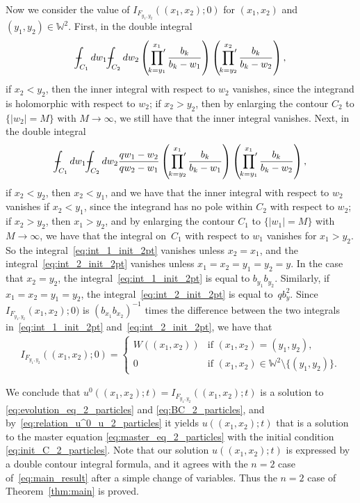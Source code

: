 \documentclass[pdftex]{sigma}
\numberwithin{equation}{section}
\def\Xint#1{\mathchoice
{\XXint\displaystyle\textstyle{#1}}%
{\XXint\textstyle\scriptstyle{#1}}%
{\XXint\scriptstyle\scriptscriptstyle{#1}}%
{\XXint\scriptscriptstyle\scriptscriptstyle{#1}}%
\!\int}
\def\XXint#1#2#3{{\setbox0=\hbox{$#1{#2#3}{\int}$}
\vcenter{\hbox{$#2#3$}}\kern-.5\wd0}}
\def\dashint{\Xint-}
\newcommand{\prodprime}{\sideset{}{'}\prod}
\newcommand{\Weylchamber}{\mathbb{W}}
\begin{document}
Now we consider the value of $I_{F_{y_1, y_2}}((x_1, x_2); 0)$ for $(x_1, x_2)$ and $(y_1, y_2) \in \Weylchamber^2$. First, in the double integral
\begin{gather} \label{eq:int_1_init_2pt}
 \dashint_{C_1} dw_1 \dashint_{C_2} dw_2 \left( \prodprime^{x_1}_{k = y_1} \frac{b_k}{b_k - w_1} \right) \left( \prodprime^{x_2}_{k = y_2} \frac{b_k}{b_k - w_2} \right),
\end{gather}
if $x_2 < y_2$, then the inner integral with respect to $w_2$ vanishes, since the integrand is holomorphic with respect to $w_2$; if $x_2 > y_2$, then by enlarging the contour $C_2$ to $\{ \lvert w_2 \rvert = M \}$ with $M \to \infty$, we still have that the inner integral vanishes. Next, in the double integral
\begin{gather} \label{eq:int_2_init_2pt}
 \dashint_{C_1} dw_1 \dashint_{C_2} dw_2 \frac{qw_1 - w_2}{qw_2 - w_1} \left( \prodprime^{x_1}_{k = y_2} \frac{b_k}{b_k - w_1} \right) \left( \prodprime^{x_1}_{k = y_1} \frac{b_k}{b_k - w_2} \right),
\end{gather}
if $x_2 < y_2$, then $x_2 < y_1$, and we have that the inner integral with respect to $w_2$ vanishes if $x_2 < y_1$, since the integrand has no pole within $C_2$ with respect to $w_2$; if $x_2 > y_2$, then $x_1 > y_2$, and by enlarging the contour $C_1$ to $\{ \lvert w_1 \rvert = M \}$ with $M \to \infty$, we have that the integral on~$C_1$ with respect to $w_1$ vanishes for $x_1 > y_2$. So the integral~\eqref{eq:int_1_init_2pt} vanishes unless $x_2 = x_1$, and the integral~\eqref{eq:int_2_init_2pt} vanishes unless $x_1 = x_2 = y_1 = y_2 = y$. In the case that $x_2 = y_2$, the integral~\eqref{eq:int_1_init_2pt} is equal to $b_{y_1} b_{y_2}$. Similarly, if $x_1 = x_2 = y_1 = y_2$, the integral~\eqref{eq:int_2_init_2pt} is equal to~$q b^2_y$. Since $I_{F_{y_1, y_2}}(x_1, x_2); 0)$ is $(b_{x_1} b_{x_2})^{-1}$ times the dif\/ference between the two integrals in~\eqref{eq:int_1_init_2pt} and~\eqref{eq:int_2_init_2pt}, we have that
\begin{gather*}
 I_{F_{y_1, y_2}}((x_1, x_2); 0) =
 \begin{cases}
 W((x_1, x_2)) & \text{if $(x_1, x_2) = (y_1, y_2)$}, \\
 0 & \text{if $(x_1, x_2) \in \Weylchamber^2 {\setminus} \{ (y_1, y_2) \}$}.
 \end{cases}
\end{gather*}

We conclude that $u^0((x_1, x_2); t) = I_{F_{y_1, y_2}}((x_1, x_2); t)$ is a solution to \eqref{eq:evolution_eq_2_particles} and \eqref{eq:BC_2_particles}, and by~\eqref{eq:relation_u^0_u_2_particles} it yields $u((x_1, x_2); t)$ that is a solution to the master equation \eqref{eq:master_eq_2_particles} with the initial condition \eqref{eq:init_C_2_particles}. Note that our solution $u((x_1, x_2); t)$ is expressed by a double contour integral formula, and it agrees with the $n = 2$ case of~\eqref{eq:main_result} after a simple change of variables. Thus the $n = 2$ case of Theorem~\ref{thm:main} is proved.
\end{document}
